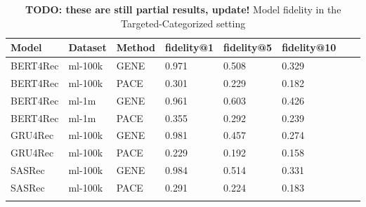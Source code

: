 \begingroup
    \setlength{\tabcolsep}{6pt} %
    \renewcommand{\arraystretch}{1.2} %
    \small %
    \begin{longtable}{|l|l|l|l|l|l|l|l|}
    \hline
\textbf{Model} & \textbf{Dataset} & \textbf{Method} & \textbf{fidelity@1} & \textbf{fidelity@5} & \textbf{fidelity@10} \\ \hline
\endhead
BERT4Rec & ml-100k & GENE & 0.971 & 0.508 & 0.329 \\
BERT4Rec & ml-100k & PACE & 0.301 & 0.229 & 0.182 \\\hline
BERT4Rec & ml-1m & GENE & 0.961 & 0.603 & 0.426 \\
BERT4Rec & ml-1m & PACE & 0.355 & 0.292 & 0.239 \\\hline
GRU4Rec & ml-100k & GENE & 0.981 & 0.457 & 0.274 \\
GRU4Rec & ml-100k & PACE & 0.229 & 0.192 & 0.158 \\\hline
SASRec & ml-100k & GENE & 0.984 & 0.514 & 0.331 \\
SASRec & ml-100k & PACE & 0.291 & 0.224 & 0.183 \\\hline
\caption{\textbf{TODO: these are still partial results, update!} Model fidelity in the Targeted-Categorized setting}
    \label{tab:eval_targ_cat}
    \end{longtable}
    \endgroup